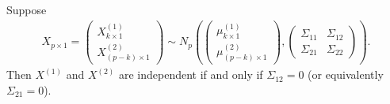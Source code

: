 \begin{proposition}
    Suppose
    \begin{align}
        X_{p \times 1} = \begin{pmatrix}
            X_{k \times 1}^{(1)} \\
            X_{(p-k) \times 1}^{(2)}
        \end{pmatrix} \sim N_{p}\left(\begin{pmatrix}
            \mu_{k \times 1}^{(1)} \\
            \mu_{(p-k) \times 1}^{(2)}
        \end{pmatrix}, \begin{pmatrix}
            \Sigma_{11} & \Sigma_{12} \\
            \Sigma_{21} & \Sigma_{22}
        \end{pmatrix}\right).
    \end{align}
    Then $X^{(1)}$ and $X^{(2)}$ are independent if and only if $\Sigma_{12} = 0$ (or equivalently $\Sigma_{21} = 0$).
\end{proposition}
